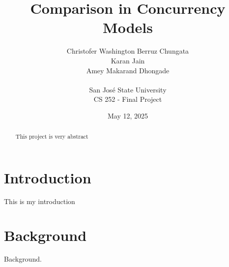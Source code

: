 \documentclass[12pt]{article}
\begin{document}
\title{Comparison in Concurrency Models}
\author{
    Christofer Washington Berruz Chungata \\ 
    Karan Jain \\ 
    Amey Makarand Dhongade \\ 
    \\
    San Jos\'{e} State University \\ 
    CS 252 - Final Project
}
\date{May 12, 2025}

\maketitle

\begin{abstract}
This project is very abstract
\end{abstract}

\section{Introduction\label{sec:introduction}}
This is my introduction

\section{Background\label{sec:background}}
Background.







\end{document}
